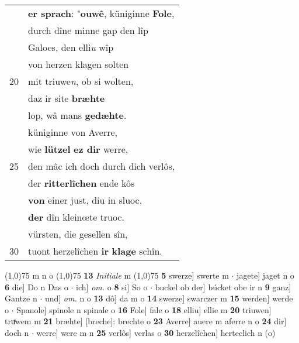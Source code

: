 \documentclass[8pt,a4paper,notitlepage]{article}
\begin{document}
\begin{table}[ht]
\begin{minipage}[t]{0.5\linewidth}
\begin{tabular}{rl}
 & \textbf{er sprach}: "\textbf{ouwê}, küniginne \textbf{Fole},\\ 
 & durch dîne minne gap den lîp\\ 
 & Galoes, den elli\textit{u} wîp\\ 
 & von herzen klagen solten\\ 
20 & mit triuwe\textit{n}, ob si wolten,\\ 
 & daz ir site \textbf{bræhte}\\ 
 & lop, wâ mans \textbf{gedæhte}.\\ 
 & küniginne von Averre,\\ 
 & wie \textbf{lützel} \textbf{ez dir} werre,\\ 
25 & den mâc ich doch durch dich verlôs,\\ 
 & der \textbf{ritterlîchen} ende kôs\\ 
 & \textbf{von} einer just, diu in sluoc,\\ 
 & \textbf{der} dîn kleinœte truoc.\\ 
 & vürsten, die gesellen sîn,\\ 
30 & tuont herzelîchen \textbf{ir} \textbf{klage} schîn.\\ 
\end{tabular}
\scriptsize
\line(1,0){75} \newline
m n o \newline
\line(1,0){75} \newline
\textbf{13} \textit{Initiale} m  \newline
\line(1,0){75} \newline
\textbf{5} swerze] swerte m  $\cdot$ jagete] jaget n o \textbf{6} die] Do n Das o  $\cdot$ ich] \textit{om.} o \textbf{8} si] So o  $\cdot$ buckel ob der] búcket obe ir n \textbf{9} ganz] Gantze n  $\cdot$ und] \textit{om.} n o \textbf{13} dô] da m o \textbf{14} swerze] swarczer m \textbf{15} werden] werde o  $\cdot$ Spanole] spinole n spinale o \textbf{16} Fole] fale o \textbf{18} elliu] ellie m \textbf{20} triuwen] truͯwem m \textbf{21} bræhte] [breche]: brechte o \textbf{23} Averre] auere m aferre n o \textbf{24} dir] doch n  $\cdot$ werre] were m n \textbf{25} verlôs] verlas o \textbf{30} herzelîchen] herteclich n (o) \newline
\end{minipage}
\end{table}
\newpage
\end{document}

